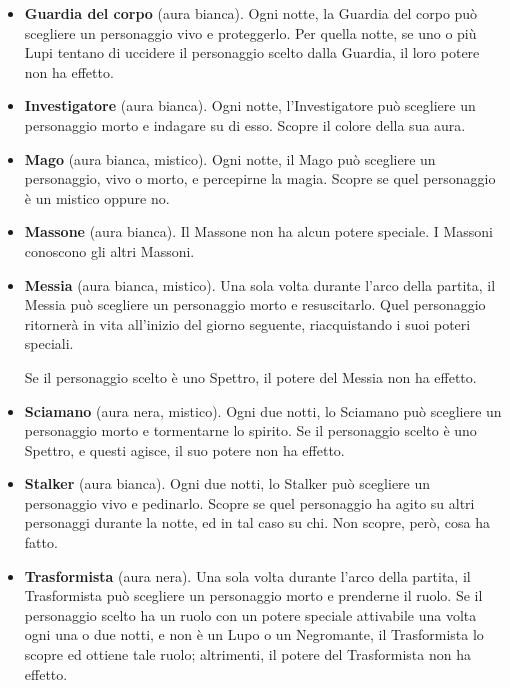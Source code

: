 \documentclass[a4paper,10pt]{article}
\begin{document}
\begin{itemize}
 \item {\bf Guardia del corpo} (aura bianca). Ogni notte, la Guardia del corpo può scegliere un personaggio vivo e proteggerlo. Per quella notte, se uno o più Lupi tentano di uccidere il personaggio scelto dalla Guardia, il loro potere non ha effetto.
 
 \item {\bf Investigatore} (aura bianca). Ogni notte, l'Investigatore può scegliere un personaggio morto e indagare su di esso. Scopre il colore della sua aura.

 \item {\bf Mago} (aura bianca, mistico). Ogni notte, il Mago può scegliere un personaggio, vivo o morto, e percepirne la magia. Scopre se quel personaggio è un mistico oppure no.
 
 \item {\bf Massone} (aura bianca). Il Massone non ha alcun potere speciale. I Massoni conoscono gli altri Massoni.
 
 \item {\bf Messia} (aura bianca, mistico). Una sola volta durante l'arco della partita, il Messia può scegliere un personaggio morto e resuscitarlo. Quel personaggio ritornerà in vita all'inizio del giorno seguente, riacquistando i suoi poteri speciali.
 
 Se il personaggio scelto è uno Spettro, il potere del Messia non ha effetto.

 \item{\bf Sciamano} (aura nera, mistico). Ogni due notti, lo Sciamano può scegliere un personaggio morto e tormentarne lo spirito. Se il personaggio scelto è uno Spettro, e questi agisce, il suo potere non ha effetto.

 \item {\bf Stalker} (aura bianca). Ogni due notti, lo Stalker può scegliere un personaggio vivo e pedinarlo. Scopre se quel personaggio ha agito su altri personaggi durante la notte, ed in tal caso su chi. Non scopre, però, cosa ha fatto.
 

 \item {\bf Trasformista} (aura nera). Una sola volta durante l'arco della partita, il Trasformista può scegliere un personaggio morto e prenderne il ruolo. Se il personaggio scelto ha un ruolo con un potere speciale attivabile una volta ogni una o due notti, e non è un Lupo o un Negromante, il Trasformista lo scopre ed ottiene tale ruolo; altrimenti, il potere del Trasformista non ha effetto.
 

\end{itemize}
\end{document}
